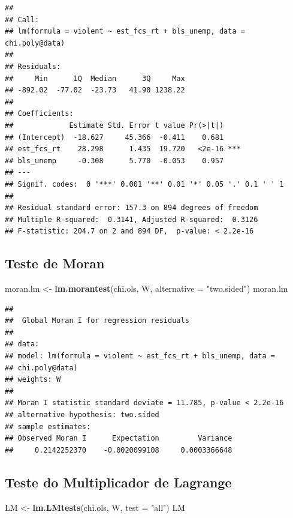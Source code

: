 \documentclass[12pt,]{article}
\newenvironment{Shaded}{\begin{snugshade}}{\end{snugshade}}
\newcommand{\KeywordTok}[1]{\textcolor[rgb]{0.13,0.29,0.53}{\textbf{{#1}}}}
\newcommand{\DataTypeTok}[1]{\textcolor[rgb]{0.13,0.29,0.53}{{#1}}}
\newcommand{\StringTok}[1]{\textcolor[rgb]{0.31,0.60,0.02}{{#1}}}
\newcommand{\NormalTok}[1]{{#1}}
\begin{document}
\begin{verbatim}
## 
## Call:
## lm(formula = violent ~ est_fcs_rt + bls_unemp, data = chi.poly@data)
## 
## Residuals:
##     Min      1Q  Median      3Q     Max 
## -892.02  -77.02  -23.73   41.90 1238.22 
## 
## Coefficients:
##             Estimate Std. Error t value Pr(>|t|)    
## (Intercept)  -18.627     45.366  -0.411    0.681    
## est_fcs_rt    28.298      1.435  19.720   <2e-16 ***
## bls_unemp     -0.308      5.770  -0.053    0.957    
## ---
## Signif. codes:  0 '***' 0.001 '**' 0.01 '*' 0.05 '.' 0.1 ' ' 1
## 
## Residual standard error: 157.3 on 894 degrees of freedom
## Multiple R-squared:  0.3141, Adjusted R-squared:  0.3126 
## F-statistic: 204.7 on 2 and 894 DF,  p-value: < 2.2e-16
\end{verbatim}

\subsection{Teste de Moran}\label{teste-de-moran}

\begin{Shaded}
\begin{Highlighting}[]
\NormalTok{moran.lm <-}\StringTok{ }\KeywordTok{lm.morantest}\NormalTok{(chi.ols, W, }\DataTypeTok{alternative =} \StringTok{"two.sided"}\NormalTok{)}
\NormalTok{moran.lm}
\end{Highlighting}
\end{Shaded}

\begin{verbatim}
## 
##  Global Moran I for regression residuals
## 
## data:  
## model: lm(formula = violent ~ est_fcs_rt + bls_unemp, data =
## chi.poly@data)
## weights: W
## 
## Moran I statistic standard deviate = 11.785, p-value < 2.2e-16
## alternative hypothesis: two.sided
## sample estimates:
## Observed Moran I      Expectation         Variance 
##     0.2142252370    -0.0020099108     0.0003366648
\end{verbatim}

\subsection{Teste do Multiplicador de
Lagrange}\label{teste-do-multiplicador-de-lagrange-1}

\begin{Shaded}
\begin{Highlighting}[]
\NormalTok{LM <-}\StringTok{ }\KeywordTok{lm.LMtests}\NormalTok{(chi.ols, W, }\DataTypeTok{test =} \StringTok{"all"}\NormalTok{)}
\NormalTok{LM}
\end{Highlighting}
\end{Shaded}
\end{document}
